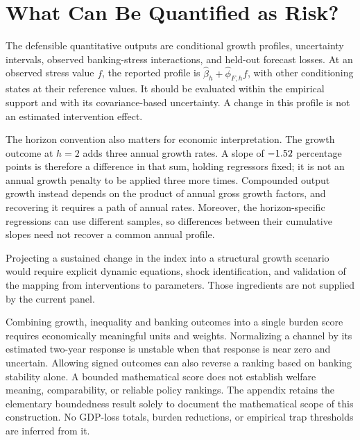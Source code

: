 \section{What Can Be Quantified as Risk?}\label{sec:risk}

The defensible quantitative outputs are conditional growth profiles,
uncertainty intervals, observed banking-stress interactions, and held-out
forecast losses. At an observed stress value $f$, the reported profile is
$\hat\beta_h+\hat\phi_{F,h}f$, with other conditioning states at their
reference values. It should be evaluated within the empirical support and
with its covariance-based uncertainty. A change in this profile is not an
estimated intervention effect.

The horizon convention also matters for economic interpretation. The growth
outcome at $h=2$ adds three annual growth rates. A slope of $-1.52$
percentage points is therefore a difference in that sum, holding regressors
fixed; it is not an annual growth penalty to be applied three more times.
Compounded output growth instead depends on the product of annual gross
growth factors, and recovering it requires a path of annual rates. Moreover,
the horizon-specific regressions can use different samples, so differences
between their cumulative slopes need not recover a common annual profile.

Projecting a sustained change in the index into a structural growth scenario
would require explicit dynamic equations,
shock identification, and validation of the mapping from interventions to
parameters. Those ingredients are not supplied by the current panel.

Combining growth, inequality and banking outcomes into a single burden score
requires economically meaningful units and weights. Normalizing a channel by
its estimated two-year response is unstable when that response is near zero
and uncertain. Allowing signed outcomes can also reverse a ranking based on
banking stability alone. A bounded mathematical score does not establish
welfare meaning, comparability, or reliable policy rankings. The appendix
retains the elementary boundedness result solely to document the mathematical
scope of this construction. No GDP-loss totals, burden reductions,
or empirical trap thresholds are inferred from it.
